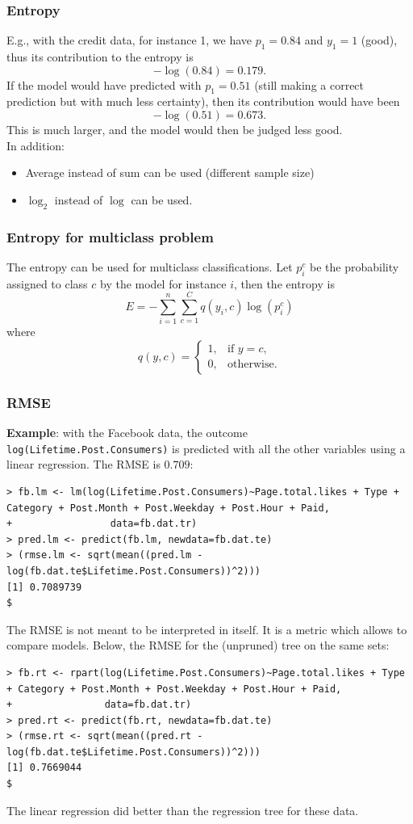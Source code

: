 \begin{frame}
\frametitle{Entropy}
E.g., with the credit data, for instance 1, we have $p_1=0.84$ and $y_1=1$ (good), thus its contribution to the entropy is
$$
-\log(0.84) = 0.179.
$$
If the model would have predicted with $p_1=0.51$ (still making a correct prediction but with much less certainty), then its contribution would have been
$$
-\log(0.51) = 0.673.
$$
This is much larger, and the model would then be judged less good.\\
\vspace{0.2cm}
In addition:
\begin{itemize}
\item Average instead of sum can be used (different sample size)
\item $\log_2$ instead of $\log$ can be used.
\end{itemize}
\end{frame}
\begin{frame}
\frametitle{Entropy for multiclass problem}
The entropy can be used for multiclass classifications. Let $p_i^c$ be the probability assigned to class $c$ by the model for instance $i$, then the entropy is
$$
E=-\sum_{i=1}^n \sum_{c=1}^C q(y_i,c) \log(p_i^c)
$$
where
$$
q(y, c) = \left\{
\begin{array}{ll}
1, & \mbox{if } y=c,\\
0, & \mbox{otherwise}.
\end{array}
\right.
$$
\end{frame}
\begin{frame}[fragile]
\frametitle{RMSE}
{\bf Example}: with the Facebook data, the outcome {\tt log(Lifetime.Post.Consumers)} is predicted with all the other variables using a linear regression. The RMSE is $0.709$:\\
\tiny
\begin{verbatim}
> fb.lm <- lm(log(Lifetime.Post.Consumers)~Page.total.likes + Type + Category + Post.Month + Post.Weekday + Post.Hour + Paid,
+                 data=fb.dat.tr)
> pred.lm <- predict(fb.lm, newdata=fb.dat.te)
> (rmse.lm <- sqrt(mean((pred.lm - log(fb.dat.te$Lifetime.Post.Consumers))^2)))
[1] 0.7089739                                                                     $
\end{verbatim}
\normalsize
The RMSE is not meant to be interpreted in itself. It is a metric which allows to compare models. Below, the RMSE for the (unpruned) tree on the same sets:\\
\tiny
\begin{verbatim}
> fb.rt <- rpart(log(Lifetime.Post.Consumers)~Page.total.likes + Type + Category + Post.Month + Post.Weekday + Post.Hour + Paid,
+                data=fb.dat.tr)
> pred.rt <- predict(fb.rt, newdata=fb.dat.te)
> (rmse.rt <- sqrt(mean((pred.rt - log(fb.dat.te$Lifetime.Post.Consumers))^2)))
[1] 0.7669044                                                                                                            $
\end{verbatim}
\normalsize
The linear regression did better than the regression tree for these data.
\end{frame}
